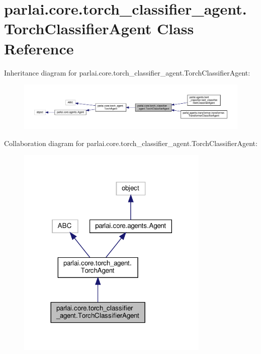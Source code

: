\hypertarget{classparlai_1_1core_1_1torch__classifier__agent_1_1TorchClassifierAgent}{}\section{parlai.\+core.\+torch\+\_\+classifier\+\_\+agent.\+Torch\+Classifier\+Agent Class Reference}
\label{classparlai_1_1core_1_1torch__classifier__agent_1_1TorchClassifierAgent}


Inheritance diagram for parlai.\+core.\+torch\+\_\+classifier\+\_\+agent.\+Torch\+Classifier\+Agent\+:
\nopagebreak
\begin{figure}[H]
\begin{center}
\leavevmode
\includegraphics[width=350pt]{d5/d0b/classparlai_1_1core_1_1torch__classifier__agent_1_1TorchClassifierAgent__inherit__graph}
\end{center}
\end{figure}


Collaboration diagram for parlai.\+core.\+torch\+\_\+classifier\+\_\+agent.\+Torch\+Classifier\+Agent\+:
\nopagebreak
\begin{figure}[H]
\begin{center}
\leavevmode
\includegraphics[width=260pt]{d7/d70/classparlai_1_1core_1_1torch__classifier__agent_1_1TorchClassifierAgent__coll__graph}
\end{center}
\end{figure}
